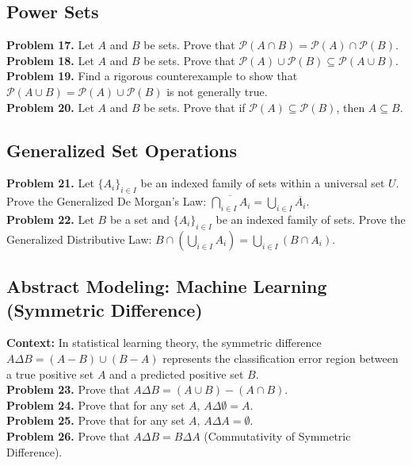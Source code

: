 \documentclass[11pt]{article}
\begin{document}
\subsection{Power Sets}
\noindent \textbf{Problem 17.} Let $A$ and $B$ be sets. Prove that $\mathcal{P}(A \cap B) = \mathcal{P}(A) \cap \mathcal{P}(B)$. \\
\textbf{Problem 18.} Let $A$ and $B$ be sets. Prove that $\mathcal{P}(A) \cup \mathcal{P}(B) \subseteq \mathcal{P}(A \cup B)$. \\
\textbf{Problem 19.} Find a rigorous counterexample to show that $\mathcal{P}(A \cup B) = \mathcal{P}(A) \cup \mathcal{P}(B)$ is not generally true. \\
\textbf{Problem 20.} Let $A$ and $B$ be sets. Prove that if $\mathcal{P}(A) \subseteq \mathcal{P}(B)$, then $A \subseteq B$.

\subsection{Generalized Set Operations}
\noindent \textbf{Problem 21.} Let $\{A_i\}_{i \in I}$ be an indexed family of sets within a universal set $U$. Prove the Generalized De Morgan's Law: $\overline{\bigcap_{i \in I} A_i} = \bigcup_{i \in I} \overline{A_i}$. \\
\textbf{Problem 22.} Let $B$ be a set and $\{A_i\}_{i \in I}$ be an indexed family of sets. Prove the Generalized Distributive Law: $B \cap \left(\bigcup_{i \in I} A_i\right) = \bigcup_{i \in I} (B \cap A_i)$.

\subsection{Abstract Modeling: Machine Learning (Symmetric Difference)}
\noindent \textbf{Context:} In statistical learning theory, the symmetric difference $A \Delta B = (A - B) \cup (B - A)$ represents the classification error region between a true positive set $A$ and a predicted positive set $B$. \\
\textbf{Problem 23.} Prove that $A \Delta B = (A \cup B) - (A \cap B)$. \\
\textbf{Problem 24.} Prove that for any set $A$, $A \Delta \emptyset = A$. \\
\textbf{Problem 25.} Prove that for any set $A$, $A \Delta A = \emptyset$. \\
\textbf{Problem 26.} Prove that $A \Delta B = B \Delta A$ (Commutativity of Symmetric Difference).
\end{document}
